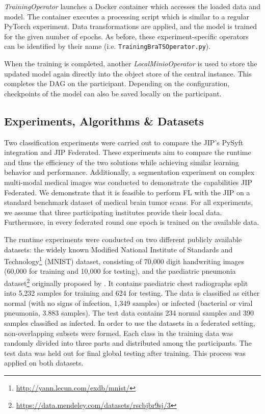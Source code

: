 \textit{TrainingOperator} launches a Docker container which accesses the loaded data and model.  The container executes a processing script which is similar to a regular PyTorch experiment. Data transformations are applied, and the model is trained for the given number of epochs.
As before, these experiment-specific operators can be identified by their name (i.e. \verb|TrainingBraTSOperator.py|).

When the training is completed, another \textit{LocalMinioOperator} is used to store the updated model again directly into the object store of the central instance.
This completes the DAG on the participant. Depending on the configuration, checkpoints of the model can also be saved locally on the participant.


\subsection{Experiments, Algorithms \& Datasets}
\label{subsec:MethodsExperiments}

Two classification experiments were carried out to compare the JIP's PySyft integration and JIP Federated. These experiments aim to compare the runtime and thus the efficiency of the two solutions while achieving similar learning behavior and performance. Additionally, a segmentation experiment on complex multi-modal medical images was conducted to demonstrate the capabilities JIP Federated. 
We demonstrate that it is feasible to perform FL with the JIP on a standard benchmark dataset of medical brain tumor scans.
For all experiments, we assume that three participating institutes provide their local data. Furthermore, in every federated round one epoch is trained on the available data.

The runtime experiments were conducted on two different publicly available datasets: the widely known Modified National Institute of Standards and Technology\footnote{\url{http://yann.lecun.com/exdb/mnist/}} (MNIST) \citep{LeCunYannandCortesCorinnaandBurges2010} dataset, consisting of 70,000 digit handwriting images (60,000 for training and 10,000 for testing), and the paediatric pneumonia dataset\footnote{\url{https://data.mendeley.com/datasets/rscbjbr9sj/3}} originally proposed by \cite{Kermany2018IdentifyingLearning}. It contains paediatric chest radiographs split into 5,232 samples for training and 624 for testing. The data is classified as either normal (with no signs of infection, 1,349 samples) or infected (bacterial or viral pneumonia, 3.883 samples). The test data contains 234 normal samples and 390 samples classified as infected. In order to use the datasets in a federated setting, non-overlapping subsets were formed. Each class in the training data was randomly divided into three parts and distributed among the participants. The test data was held out for final global testing after training. This process was applied on both datasets.

